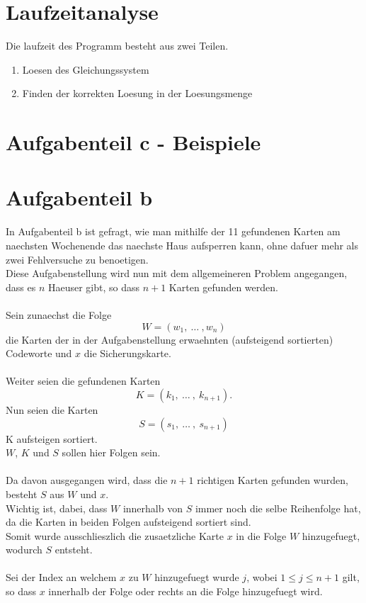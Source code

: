 \documentclass[a4paper,10pt,ngerman]{scrartcl}
\begin{document}
\section{Laufzeitanalyse}
Die laufzeit des Programm besteht aus zwei Teilen.
\begin{enumerate}
	\item Loesen des Gleichungssystem
	\item Finden der korrekten Loesung in der Loesungsmenge
\end{enumerate}

\section{Aufgabenteil c - Beispiele}

\section{Aufgabenteil b}
In Aufgabenteil b ist gefragt, wie man mithilfe der 11 gefundenen Karten am naechsten Wochenende das naechste Haus aufsperren kann, ohne dafuer mehr als zwei Fehlversuche zu benoetigen.\\
Diese Aufgabenstellung wird nun mit dem allgemeineren  Problem angegangen, dass es $n$ Haeuser gibt, so dass $n+1$ Karten gefunden werden.
\\\\
Sein zunaechst die Folge 
$$
W = (w_1, \ \dots \ , w_n)
$$
die Karten der in der Aufgabenstellung erwaehnten (aufsteigend sortierten) Codeworte und $x$ die Sicherungskarte.\\
\\
Weiter seien die gefundenen Karten
$$K = (k_1, \ \dots \ , \ k_{n+1}). $$
Nun seien die Karten 
$$S = (s_1, \ \dots \ , \ s_{n+1}) $$
K aufsteigen sortiert.\\
$W$, $K$ und $S$ sollen hier Folgen sein.
\\\\
Da davon ausgegangen wird, dass die $n+1$ richtigen Karten gefunden wurden, besteht $S$ aus $W$ und $x$.
\\
Wichtig ist, dabei, dass $W$ innerhalb von $S$ immer noch die selbe Reihenfolge hat, da die Karten in beiden Folgen aufsteigend sortiert sind.\\
Somit wurde ausschlieszlich die zusaetzliche Karte $x$ in die Folge $W$ hinzugefuegt, wodurch $S$ entsteht.
\\\\
Sei der Index an welchem $x$ zu $W$ hinzugefuegt wurde $j$, wobei $1 \leq j \leq n+1$ gilt, so dass $x$ innerhalb der Folge oder rechts an die Folge hinzugefuegt wird.
\end{document}
